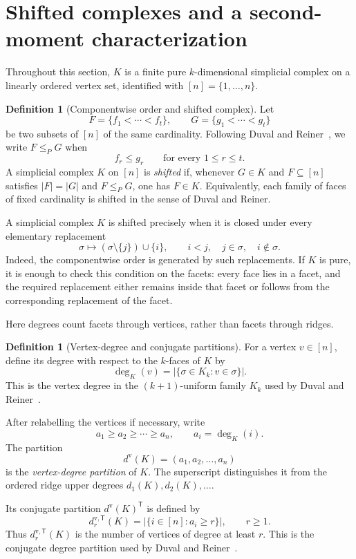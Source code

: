 \documentclass[11pt,reqno]{amsart}
\numberwithin{equation}{section}
\theoremstyle{plain}
\theoremstyle{definition}
\newtheorem{definition}[theorem]{Definition}
\newcommand{\T}{\mathsf{T}}
\begin{document}
\section{Shifted complexes and a second-moment characterization}\label{sec:shifted}

Throughout this section, $K$ is a finite pure $k$-dimensional simplicial complex on a linearly
ordered vertex set, identified with $[n]=\{1,\dots,n\}$. 



\begin{definition}[Componentwise order and shifted complex]
\label{def:componentwise}\label{def:shifted}
Let
\[
  F=\{f_1<\cdots<f_t\},\qquad G=\{g_1<\cdots<g_t\}
\]
be two subsets of $[n]$ of the same cardinality. Following Duval and
Reiner~\cite[Definition 2.1]{DuvalReiner}, we write $F\le_P G$ when
\[
  f_r\le g_r\qquad\text{for every }1\le r\le t.
\]
A simplicial complex $K$ on $[n]$ is \emph{shifted} if, whenever $G\in K$ and
$F\subseteq[n]$ satisfies $|F|=|G|$ and $F\le_P G$, one has $F\in K$. Equivalently, each
family of faces of fixed cardinality is shifted in the sense of Duval and Reiner.
\end{definition}

A simplicial complex $K$ is shifted precisely when it is closed under every elementary
replacement
\[
  \sigma\longmapsto(\sigma\setminus\{j\})\cup\{i\},
  \qquad i<j,\quad j\in\sigma,\quad i\notin\sigma.
\]
Indeed, the componentwise order is generated by such replacements. If $K$ is pure, it is enough
to check this condition on the facets: every face lies in a facet, and the required replacement
either remains inside that facet or follows from the corresponding replacement of the facet.

Here degrees count facets through vertices, rather than facets through ridges.

\begin{definition}[Vertex-degree and conjugate partitions]
\label{def:vertexdegree}\label{def:conjugate}
For a vertex $v\in[n]$, define its degree with respect to the $k$-faces of $K$ by
\[
  \deg_K(v)=\bigl|\{\sigma\in K_k:v\in\sigma\}\bigr|.
\]
This is the vertex degree in the $(k+1)$-uniform family $K_k$ used by Duval and
Reiner~\cite[Section 2]{DuvalReiner}.

After relabelling the vertices if necessary, write
\[
  a_1\ge a_2\ge\cdots\ge a_n,
  \qquad a_i=\deg_K(i).
\]
The partition
\[
  d^{\mathrm v}(K)=(a_1,a_2,\ldots,a_n)
\]
is the \emph{vertex-degree partition} of $K$. The superscript distinguishes it from the ordered
ridge upper degrees $d_1(K),d_2(K),\dots$.

Its conjugate partition ${d^{\mathrm v}(K)}^{\T}$ is defined by
\[
  d^{\mathrm v,\T}_r(K)=\bigl|\{i\in[n]:a_i\ge r\}\bigr|,\qquad r\ge1.
\]
Thus $d^{\mathrm v,\T}_r(K)$ is the number of vertices of degree at least $r$. This is the
conjugate degree partition used by Duval and Reiner~\cite[Section 2]{DuvalReiner}.
\end{definition}
\end{document}
